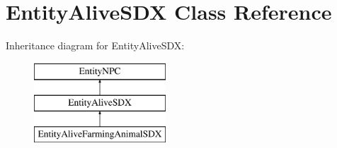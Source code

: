 \hypertarget{class_entity_alive_s_d_x}{}\section{Entity\+Alive\+S\+DX Class Reference}
\label{class_entity_alive_s_d_x}
Inheritance diagram for Entity\+Alive\+S\+DX\+:\begin{figure}[H]
\begin{center}
\leavevmode
\includegraphics[height=3.000000cm]{dc/dd7/class_entity_alive_s_d_x}
\end{center}
\end{figure}

